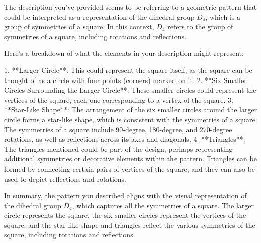 The description you've provided seems to be referring to a geometric pattern that could be interpreted as a representation of the dihedral group \(D_4\), which is a group of symmetries of a square. In this context, \(D_4\) refers to the group of symmetries of a square, including rotations and reflections.

Here's a breakdown of what the elements in your description might represent:

1. **Larger Circle**: This could represent the square itself, as the square can be thought of as a circle with four points (corners) marked on it.
2. **Six Smaller Circles Surrounding the Larger Circle**: These smaller circles could represent the vertices of the square, each one corresponding to a vertex of the square.
3. **Star-Like Shape**: The arrangement of the six smaller circles around the larger circle forms a star-like shape, which is consistent with the symmetries of a square. The symmetries of a square include 90-degree, 180-degree, and 270-degree rotations, as well as reflections across its axes and diagonals.
4. **Triangles**: The triangles mentioned could be part of the design, perhaps representing additional symmetries or decorative elements within the pattern. Triangles can be formed by connecting certain pairs of vertices of the square, and they can also be used to depict reflections and rotations.

In summary, the pattern you described aligns with the visual representation of the dihedral group \(D_4\), which captures all the symmetries of a square. The larger circle represents the square, the six smaller circles represent the vertices of the square, and the star-like shape and triangles reflect the various symmetries of the square, including rotations and reflections.